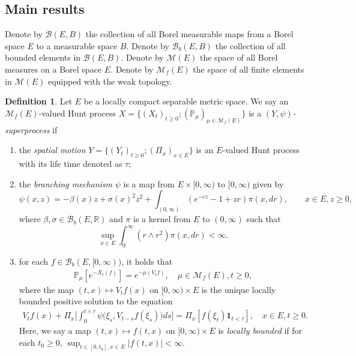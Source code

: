 \documentclass[12pt,a4paper]{amsart}
\numberwithin{equation}{section}
\theoremstyle{plain}
\theoremstyle{definition}
\newtheorem{defi}[thm]{Definition}
\begin{document}
\subsection{Main results}
\label{sec:MR}
Denote by $\mathcal B(E,B)$ the collection of all Borel measurable maps from a Borel space $E$ to a measurable space $B$.
Denote by $\mathcal B_b(E,B)$ the collection of all bounded elements in $\mathcal B(E,B)$.
Denote by $\mathcal M(E)$ the space of all Borel measures on a Borel space $E$. 
Denote by $\mathcal M_f(E)$ the space of all finite elements in $\mathcal M(E)$ equipped with the weak topology. 

\begin{defi}
\label{def:SP}
Let $E$ be a locally compact separable metric space. 
We say an $\mathcal M_f(E)$-valued Hunt process $X= \{(X_t)_{t\geq 0}; (\mathbb P_\mu)_{\mu\in \mathcal M_f(E)}\}$ is a \emph{$(Y,\psi)$-superprocess} if
\begin{enumerate}
\item
\label{def:SP:1}
  the \emph{spatial motion} $Y=\{(Y_t)_{t\geq 0};(\Pi_x)_{x\in E}\}$ is an $E$-valued Hunt process with its life time denoted as $\tau$;
\item
  \label{def:SP:2}
  the \emph{branching mechanism} $\psi$ is a map from $E\times[0,\infty)$ to $[0,\infty)$ given by
  \[
    \psi(x,z)
    =-\beta(x)z + \sigma(x)^2 z^2+ \int_{(0,\infty)} (e^{-rz}-1+zr ) \pi(x, dr),\qquad x\in E, z\geq0,
  \]
  where $\beta, \sigma\in \mathcal B_b(E,\mathbb R)$ and $\pi$ is a kernel from $E$ to $(0,\infty)$ such that
  \[
    \sup_{x\in E}\int_0^\infty (r\wedge r^2)\pi(x,dr)
    <\infty.
  \]
\item
  \label{def:SP:3}
  for each $f\in \mathcal B_b(E,[0,\infty))$, it holds that
  \begin{align}
    \mathbb P_\mu [e^{- X_t(f)}] = e^{-\mu(V_tf)},
    \quad \mu \in \mathcal M_f(E),t\geq 0,
  \end{align}
  where the map $(t,x) \mapsto V_tf(x)$ on $[0,\infty) \times E$ is the unique locally bounded positive solution to the equation
  \begin{align}
    V_t f(x) +   \Pi_x\Big[\int_0^{t\wedge \tau} \psi \big(\xi_s,V_{t-s} f(\xi_s)\big) ds\Big]
    = \Pi_x[f(\xi_t) \mathbf 1_{t < \tau}],
    \quad x \in E, t \geq 0.
  \end{align}
  Here, we say a map $(t,x) \mapsto f(t,x)$ on $[0,\infty)\times E$ is \emph{locally bounded} if for each $t_0 \geq 0$, $\sup_{t\in [0,t_0], x\in E} |f(t,x)| < \infty$.
\end{enumerate}
\end{defi}
\end{document}
